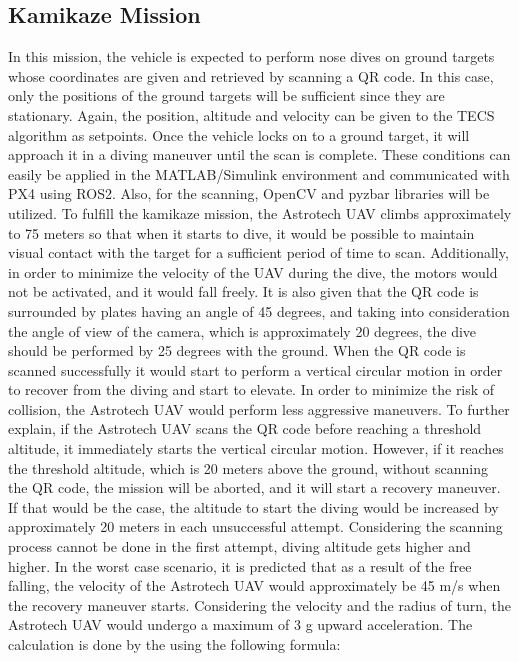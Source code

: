 \documentclass[12pt]{article}
\begin{document}
\subsection{Kamikaze Mission}
\justify In this mission, the vehicle is expected to perform nose dives on ground targets whose coordinates are given and retrieved by scanning a QR code. In this case, only the positions of the ground targets will be sufficient since they are stationary. Again, the position, altitude and velocity can be given to the TECS algorithm as setpoints. Once the vehicle locks on to a ground target, it will approach it in a diving maneuver until the scan is complete. These conditions can easily be applied in the MATLAB/Simulink environment and communicated with PX4 using ROS2. Also, for the scanning, OpenCV and pyzbar libraries will be utilized.
\justify To fulfill the kamikaze mission, the Astrotech UAV climbs approximately to 75 meters so that when it starts to dive, it would be possible to maintain visual contact with the target for a sufficient period of time to scan. Additionally, in order to minimize the velocity of the UAV during the dive, the motors would not be activated, and it would fall freely. It is also given that the QR code is surrounded by plates having an angle of 45 degrees, and taking into consideration the angle of view of the camera, which is approximately 20 degrees, the dive should be performed by 25 degrees with the ground. When the QR code is scanned successfully it would start to perform a vertical circular motion in order to recover from the diving and start to elevate.
\justify In order to minimize the risk of collision, the Astrotech UAV would perform less aggressive maneuvers. To further explain, if the Astrotech UAV scans the QR code before reaching a threshold altitude, it immediately starts the vertical circular motion. However, if it reaches the threshold altitude, which is 20 meters above the ground, without scanning the QR code, the mission will be aborted, and  it will start a recovery maneuver. If that would be the case, the altitude to start the diving would be increased by approximately 20 meters in each unsuccessful attempt.
\justify Considering the scanning process cannot be done in the first attempt, diving altitude gets higher and higher. In the worst case scenario, it is predicted that as a result of the free falling, the velocity of the Astrotech UAV would approximately be 45 m/s when the recovery maneuver starts. Considering the velocity and the radius of turn, the Astrotech UAV would undergo a maximum of 3 g upward acceleration. The calculation is done by the using the following formula:
\end{document}
